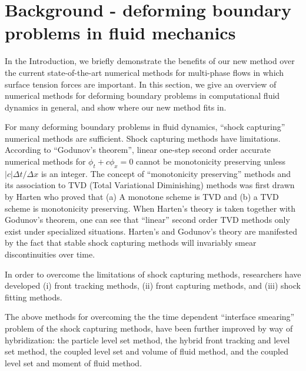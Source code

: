 \documentclass[]{article}
\begin{document}
\section{Background - deforming boundary problems in fluid mechanics}

In the Introduction, we briefly demonstrate the benefits of our
new method over the current state-of-the-art numerical methods
for multi-phase flows in which surface tension forces are important.  
In this section, we give an overview of numerical methods for 
deforming boundary problems in computational fluid dynamics in general,
and show where our new method fits in.

For many deforming boundary problems in fluid dynamics, ``shock capturing''
numerical methods are 
sufficient\cite{godunov1959finite,colella1984piecewise,van1979towards,harten1997high,shu1988efficient,saurel1999multiphase}. Shock capturing methods
have limitations.  According to 
``Godunov's theorem''\cite{godunov1954different}, linear one-step second
order accurate numerical methods for $\phi_{t}+c\phi_{x}=0$ cannot be
monotonicity preserving unless $|c|\Delta t/\Delta x$ is an 
integer.  The concept of ``monotonicity preserving'' methods and its
association to TVD (Total Variational Diminishing) methods was first 
drawn by Harten\cite{harten1997high} who proved that (a) A monotone
scheme is TVD and (b) a TVD scheme is monotonicity preserving.  
When Harten's theory is taken together with Godunov's theorem, one can
see that ``linear'' second order TVD methods only exist under
specialized situations.  Harten's and Godunov's theory are manifested by the
fact that stable shock capturing methods will invariably smear 
discontinuities over time.  

In order to overcome the limitations of shock capturing methods, researchers
have developed (i) front tracking 
methods\cite{glimm1981front,unverdi1992front},
(ii) front capturing 
methods\cite{markstein1951interaction,osher1988fronts,sussman1994level,hirt1981volume,brackbill1992continuum,ahn2007multi,ahn2009adaptive,olsson2005conservative,QiuETALPINNPHASEFIELD2022,
huang2020consistent}, and
(iii) shock fitting methods\cite{SalasShockfitting1976}.

The above methods for overcoming the
the time dependent 
``interface smearing'' problem of the shock capturing methods, have been
further improved by way of hybridization:
the particle level set method\cite{enright2002hybrid},
the hybrid front tracking and level set method\cite{shin2009hybrid},
the coupled level set and volume of fluid method\cite{sussman2000coupled},
and the coupled level set and moment of fluid 
method\cite{ASURIMUKUNDAN2022110864,jemison2013coupled}.
\end{document}
